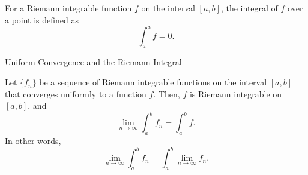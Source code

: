 \documentclass[12pt,a4paper]{article}
\begin{document}
\vspace{100pt}

\begin{definition}
    For a Riemann integrable function $f$ on the interval $[a,b]$, the integral of $f$ over a point is defined as
    \[
        \int_a^a f = 0.
    \]
\end{definition}


\clearpage

\begin{heading}
    Uniform Convergence and the Riemann Integral
\end{heading}

\vspace{10pt}

\begin{theorem}
    Let $\{f_n\}$ be a sequence of Riemann integrable functions on the interval $[a,b]$ that converges uniformly to a function $f$. Then, $f$ is Riemann integrable on $[a,b]$, and
    \[
        \lim_{n \to \infty} \int_a^b f_n = \int_a^b f.
    \]
    In other words,
    \[
        \lim_{n \to \infty} \int_a^b f_n = \int_a^b \lim_{n \to \infty} f_n.
    \]
\end{theorem}








\EndPage
\end{document}
